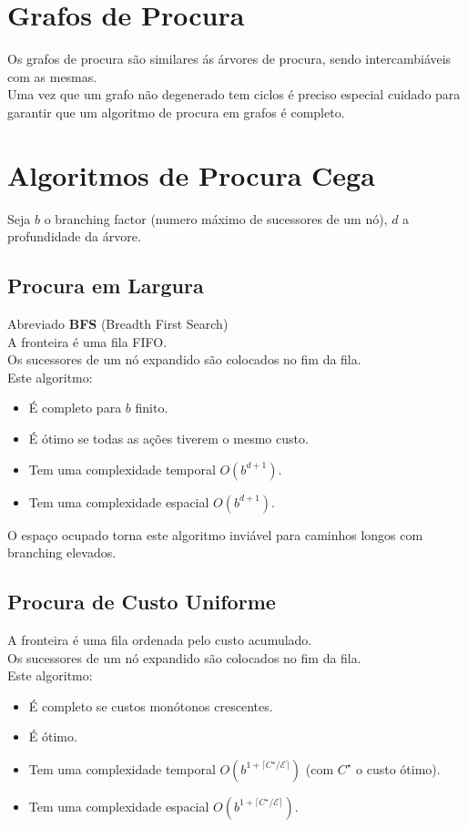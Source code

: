 \documentclass[]{report}
\begin{document}
\section{Grafos de Procura}
Os grafos de procura são similares ás árvores de procura, sendo intercambiáveis com as mesmas.\\
Uma vez que um grafo não degenerado tem ciclos é preciso especial cuidado para garantir que um algoritmo de procura em grafos é completo.
\clearpage
\section{Algoritmos de Procura Cega}
Seja $b$ o branching factor (numero máximo de sucessores de um nó), $d$ a profundidade da árvore.
\subsection{Procura em Largura}
Abreviado \textbf{BFS} (Breadth First Search)\\
A fronteira é uma fila FIFO.\\
Os sucessores de um nó expandido são colocados no fim da fila.\\
Este algoritmo:
\begin{itemize}
	\item É completo para $b$ finito.
	\item É ótimo se todas as ações tiverem o mesmo custo.
	\item Tem uma complexidade temporal $O(b^{d+1})$.
	\item Tem uma complexidade espacial $O(b^{d+1})$.\\
\end{itemize}
O espaço ocupado torna este algoritmo inviável para caminhos longos com branching elevados.
\subsection{Procura de Custo Uniforme}
A fronteira é uma fila ordenada pelo custo acumulado.\\
Os sucessores de um nó expandido são colocados no fim da fila.\\
Este algoritmo:
\begin{itemize}
	\item É completo se custos monótonos crescentes.
	\item É ótimo.
	\item Tem uma complexidade temporal $O(b^{1+ \lceil C^\star / \mathcal{E} \rceil})$ (com $C^\star$ o custo ótimo).
	\item Tem uma complexidade espacial $O(b^{1+ \lceil C^\star / \mathcal{E} \rceil})$.\\
\end{itemize}
\end{document}
